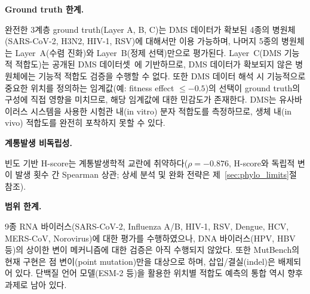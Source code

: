 \begin{table}[htbp]
\centering
\caption{MutBench 한계점 요약 및 완화 현황}
\label{tab:limitations_summary}
\small
{}
\end{table}

\textbf{Ground truth 한계.}

완전한 3계층 ground truth(Layer A, B, C)는 DMS 데이터가 확보된 4종의 병원체(SARS-CoV-2, H3N2, HIV-1, RSV)에 대해서만 이용 가능하며, 나머지 5종의 병원체는 Layer~A(수렴 진화)와 Layer~B(정제 선택)만으로 평가된다.
Layer~C(DMS 기능적 적합도)는 공개된 DMS 데이터셋~\cite{dadonaite2023dms}에 기반하므로, DMS 데이터가 확보되지 않은 병원체에는 기능적 적합도 검증을 수행할 수 없다.
또한 DMS 데이터 해석 시 기능적으로 중요한 위치를 정의하는 임계값(예: fitness effect $\leq -0.5$)의 선택이 ground truth의 구성에 직접 영향을 미치므로, 해당 임계값에 대한 민감도가 존재한다.
DMS는 유사바이러스 시스템을 사용한 시험관 내(in vitro) 분자 적합도를 측정하므로, 생체 내(in vivo) 적합도를 완전히 포착하지 못할 수 있다.

\textbf{계통발생 비독립성.}

빈도 기반 H-score는 계통발생학적 교란에 취약하다($\rho = -0.876$, H-score와 독립적 변이 발생 횟수 간 Spearman 상관; 상세 분석 및 완화 전략은 제~\ref{sec:phylo_limits}절 참조).

\textbf{범위 한계.}

9종 RNA 바이러스(SARS-CoV-2, Influenza A/B, HIV-1, RSV, Dengue, HCV, MERS-CoV, Norovirus)에 대한 평가를 수행하였으나, DNA 바이러스(HPV, HBV 등)의 상이한 변이 메커니즘에 대한 검증은 아직 수행되지 않았다.
또한 MutBench의 현재 구현은 점 변이(point mutation)만을 대상으로 하며, 삽입/결실(indel)은 배제되어 있다.
단백질 언어 모델(ESM-2 등)을 활용한 위치별 적합도 예측의 통합 역시 향후 과제로 남아 있다.

